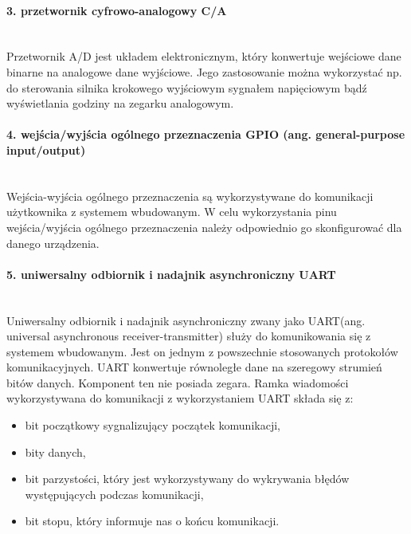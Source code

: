 \documentclass[12p]{article}
\begin{document}
\paragraph{3. przetwornik cyfrowo-analogowy C/A} \mbox{} \\

Przetwornik A/D jest układem elektronicznym, który konwertuje wejściowe dane binarne na analogowe dane wyjściowe. Jego zastosowanie można wykorzystać np. do sterowania silnika krokowego wyjściowym sygnałem napięciowym bądź wyświetlania godziny na zegarku analogowym.

\paragraph{4. wejścia/wyjścia ogólnego przeznaczenia GPIO (ang. general-purpose input/output)} \mbox{} \\


Wejścia-wyjścia ogólnego przeznaczenia są wykorzystywane do komunikacji użytkownika z systemem wbudowanym. W celu wykorzystania pinu wejścia/wyjścia ogólnego przeznaczenia należy odpowiednio go skonfigurować dla danego urządzenia.

\paragraph{5. uniwersalny odbiornik i nadajnik asynchroniczny UART} \mbox{} \\

Uniwersalny odbiornik i nadajnik asynchroniczny zwany jako UART(ang. universal asynchronous receiver-transmitter) służy do komunikowania się z systemem wbudowanym. Jest on jednym z powszechnie stosowanych protokołów komunikacyjnych. UART konwertuje równoległe dane na szeregowy strumień bitów danych. Komponent ten nie posiada zegara. Ramka wiadomości wykorzystywana do komunikacji z wykorzystaniem UART składa się z:
\begin{itemize}
\item bit początkowy sygnalizujący początek komunikacji,
\item bity danych,
\item bit parzystości, który jest wykorzystywany do wykrywania błędów występujących podczas komunikacji,
\item bit stopu, który informuje nas o końcu komunikacji.
\end{itemize} 
\end{document}
